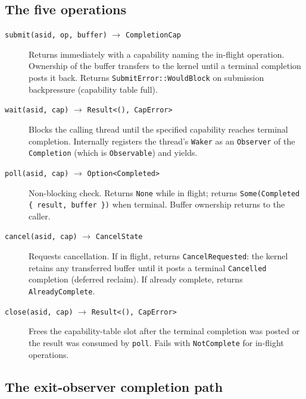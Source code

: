 \subsection{The five operations}

\begin{description}
    \item[\texttt{submit(asid, op, buffer)} $\rightarrow$ \texttt{CompletionCap}]
        Returns immediately with a capability naming the in-flight operation.
        Ownership of the buffer transfers to the kernel until a terminal
        completion posts it back. Returns \texttt{SubmitError::WouldBlock} on
        submission backpressure (capability table full).

    \item[\texttt{wait(asid, cap)} $\rightarrow$ \texttt{Result<(), CapError>}]
        Blocks the calling thread until the specified capability reaches
        terminal completion. Internally registers the thread's \texttt{Waker}
        as an \texttt{Observer} of the \texttt{Completion} (which is
        \texttt{Observable}) and yields.

    \item[\texttt{poll(asid, cap)} $\rightarrow$ \texttt{Option<Completed>}]
        Non-blocking check. Returns \texttt{None} while in flight; returns
        \texttt{Some(Completed \{ result, buffer \})} when terminal. Buffer
        ownership returns to the caller.

    \item[\texttt{cancel(asid, cap)} $\rightarrow$ \texttt{CancelState}]
        Requests cancellation. If in flight, returns \texttt{CancelRequested}:
        the kernel retains any transferred buffer until it posts a terminal
        \texttt{Cancelled} completion (deferred reclaim). If already complete,
        returns \texttt{AlreadyComplete}.

    \item[\texttt{close(asid, cap)} $\rightarrow$ \texttt{Result<(), CapError>}]
        Frees the capability-table slot after the terminal completion was
        posted or the result was consumed by \texttt{poll}. Fails with
        \texttt{NotComplete} for in-flight operations.
\end{description}

\subsection{The exit-observer completion path}

